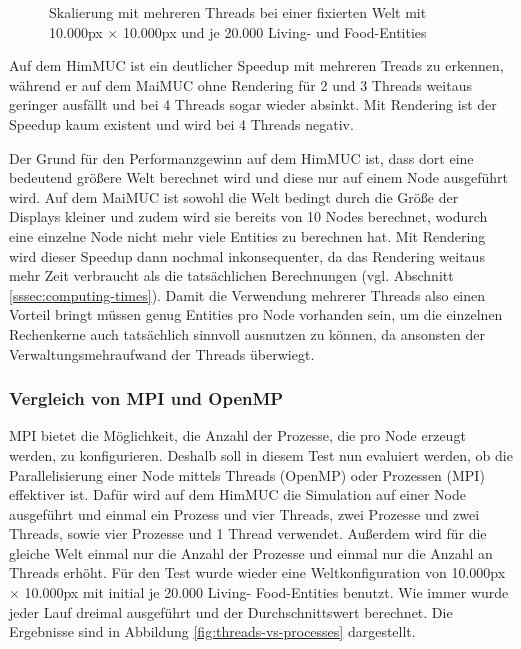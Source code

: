 \documentclass[course=erap]{aspdoc}
\begin{document}
\begin{figure}[h!]
\centering
{}
\caption{Skalierung mit mehreren Threads bei einer fixierten Welt mit 10.000px $\times$ 10.000px und je 20.000 Living- und Food-Entities}
\label{fig:thread-scaling}
\end{figure}

Auf dem HimMUC ist ein deutlicher Speedup mit mehreren Treads zu erkennen, während er auf dem MaiMUC ohne Rendering für 2 und 3 Threads weitaus geringer ausfällt und bei 4 Threads sogar wieder absinkt. Mit Rendering ist der Speedup kaum existent und wird bei 4 Threads negativ.

Der Grund für den Performanzgewinn auf dem HimMUC ist, dass dort eine bedeutend größere Welt berechnet wird und diese nur auf einem Node ausgeführt wird. Auf dem MaiMUC ist sowohl die Welt bedingt durch die Größe der Displays kleiner und zudem wird sie bereits von 10 Nodes berechnet, wodurch eine einzelne Node nicht mehr viele Entities zu berechnen hat. Mit Rendering wird dieser Speedup dann nochmal inkonsequenter, da das Rendering weitaus mehr Zeit verbraucht als die tatsächlichen Berechnungen (vgl. Abschnitt \ref{sssec:computing-times}). Damit die Verwendung mehrerer Threads also einen Vorteil bringt müssen genug Entities pro Node vorhanden sein, um die einzelnen Rechenkerne auch tatsächlich sinnvoll ausnutzen zu können, da ansonsten der Verwaltungsmehraufwand der Threads überwiegt.

\subsubsection{Vergleich von MPI und OpenMP}
MPI bietet die Möglichkeit, die Anzahl der Prozesse, die pro Node erzeugt werden, zu konfigurieren. Deshalb soll in diesem Test nun evaluiert werden, ob die Parallelisierung einer Node mittels Threads (OpenMP) oder Prozessen (MPI) effektiver ist. Dafür wird auf dem HimMUC die Simulation auf einer Node ausgeführt und einmal ein Prozess und vier Threads, zwei Prozesse und zwei Threads, sowie vier Prozesse und 1 Thread verwendet. Außerdem wird für die gleiche Welt einmal nur die Anzahl der Prozesse und einmal nur die Anzahl an Threads erhöht. Für den Test wurde wieder eine Weltkonfiguration von 10.000px $\times$ 10.000px mit initial je 20.000 Living- Food-Entities benutzt. Wie immer wurde jeder Lauf dreimal ausgeführt und der Durchschnittswert berechnet. Die Ergebnisse sind in Abbildung \ref{fig:threads-vs-processes} dargestellt.
\end{document}

